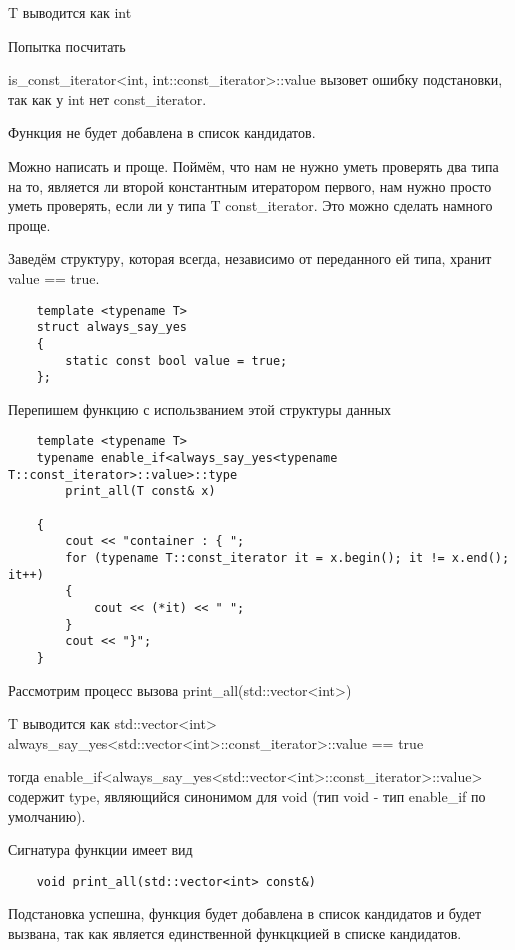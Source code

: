	T выводится как int
	
	Попытка посчитать 
	
	is\_const\_iterator<int, int::const\_iterator>::value вызовет ошибку подстановки, так как у int нет const\_iterator. 
	
	Функция не будет добавлена в список кандидатов.
	
	\vspace{\baselineskip}
	
	Можно написать и проще. Поймём, что нам не нужно уметь проверять два типа на то, является ли второй константным итератором первого, нам нужно просто уметь проверять, если ли у типа T const\_iterator. Это можно сделать намного проще.

	Заведём структуру, которая всегда, независимо от переданного ей типа, хранит value == true.
	
	\begin{verbatim}
	template <typename T>
	struct always_say_yes
	{
        static const bool value = true;
	};
	\end{verbatim}
	
	Перепишем функцию с использванием этой структуры данных
	
	\begin{verbatim}
	template <typename T>
	typename enable_if<always_say_yes<typename T::const_iterator>::value>::type 
	    print_all(T const& x)

	{
	    cout << "container : { ";
 	    for (typename T::const_iterator it = x.begin(); it != x.end(); it++)
	    {
            cout << (*it) << " ";
	    }
	    cout << "}";
	}
	\end{verbatim}
	
	Рассмотрим процесс вызова print\_all(std::vector<int>)
	
	T выводится как std::vector<int>
	always\_say\_yes<std::vector<int>::const\_iterator>::value == true
	
	тогда enable\_if<always\_say\_yes<std::vector<int>::const\_iterator>::value> содержит type, являющийся синонимом для void (тип void - тип enable\_if по умолчанию).
	
	Сигнатура функции имеет вид
	
	\begin{verbatim}
	void print_all(std::vector<int> const&)
	\end{verbatim}
	
	Подстановка успешна, функция будет добавлена в список кандидатов и будет вызвана, так как является единственной функцкцией в списке кандидатов.
	
